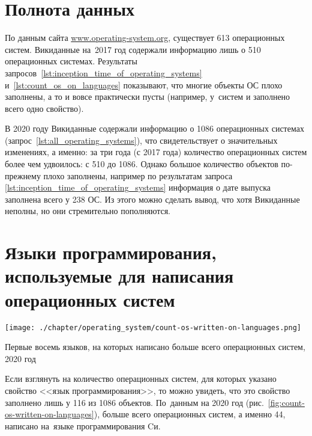 \newpage
\section{Полнота данных}

По данным сайта \href{https://www.operating-system.org/}
                             {www.operating-system.org}, 
существует 613 операционных систем. 
Викиданные на~2017 год содержали информацию лишь о 510 операционных системах. 
Результаты запросов~\ref{lst:inception_time_of_operating_systems} 
                  и~\ref{lst:count_os_on_languages} показывают, 
что многие объекты ОС плохо заполнены, а то и вовсе практически пусты 
(например, у~систем  и  
заполнено всего одно свойство).

В 2020 году Викиданные содержали информацию о 1086 операционных системах 
(запрос~\ref{lst:all_operating_systems}), что свидетельствует о значительных изменениях, 
а именно: за три года (с 2017 года) количество операционных систем более чем удвоилось: с 510 до 1086. 
Однако большое количество объектов по-прежнему плохо заполнены, 
например по результатам запроса \ref{lst:inception_time_of_operating_systems} 
информация о дате выпуска заполнена всего у 238 ОС. 
Из этого можно сделать вывод, что хотя Викиданные неполны, но они стремительно пополняются.




\section{Языки программирования, используемые для написания операционных систем}
%
\begin{marginfigure}[0\baselineskip]
	\texttt{[image: ./chapter/operating\_system/count-os-written-on-languages.png]}
    \caption[Первые языки, на которых написано больше всего ОС, 2020 год.]{Первые восемь языков, на которых написано больше всего операционных систем, 2020 год}
	\label{fig:count-os-written-on-languages}
\end{marginfigure}

Если взглянуть на количество операционных систем, для которых указано свойство <<язык программирования>>, 
    то можно увидеть, что это свойство заполнено лишь у 116 из 1086 объектов. 
    По~данным на 2020 год (рис.~\ref{fig:count-os-written-on-languages}), 
    больше всего операционных систем, а именно 44, написано на~языке программирования Cи.





